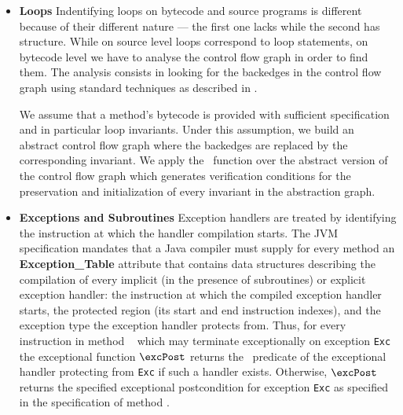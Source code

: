 \begin{itemize}
\item \textbf{Loops}
Indentifying loops on bytecode and source programs is different because of their different nature --- 
the first one lacks while the second has structure. While on source level loops correspond to loop statements,  
on bytecode level we have to analyse the control flow graph in order to find them.
 The analysis consists in looking for the backedges in the control flow graph using standard techniques as described in \cite{ARUCom1986}. 
  
 We assume that a method's bytecode is provided with sufficient specification and in particular loop invariants.
 Under this assumption, we build an abstract control flow graph where the backedges are replaced by
 the corresponding invariant. We apply the \wpi \ function over the abstract version of the control flow graph which generates verification conditions for the 
preservation and initialization of every invariant in the abstraction graph. 


     

\item \textbf{Exceptions and Subroutines}
Exception handlers are treated by identifying the instruction at which the handler compilation starts. The JVM specification mandates 
that a Java compiler must supply for every method an \textbf{Exception\_Table} attribute that contains data structures describing the compilation of every implicit (in the presence of subroutines) or explicit exception handler: the instruction at which the compiled exception handler starts,
 the protected region (its start and end instruction indexes), and the exception type the exception handler protects from. Thus, 
for every instruction  in method \method~ which may terminate exceptionally on exception \texttt{Exc} the exceptional function
 $\excPost$  returns the \wpi \ predicate of the exceptional handler protecting  from \texttt{Exc} if such a handler exists.
Otherwise, $\excPost$ returns the specified exceptional postcondition for exception \texttt{Exc} as specified in the specification of
method \method.


\end{itemize}
